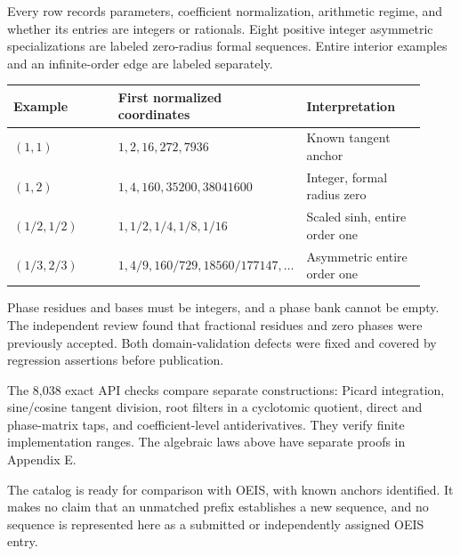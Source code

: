 Every row records parameters, coefficient normalization, arithmetic regime,
and whether its entries are integers or rationals. Eight positive integer
asymmetric specializations are labeled zero-radius formal sequences. Entire
interior examples and an infinite-order edge are labeled separately.

\begin{tabular}{@{}P{0.27\linewidth}P{0.35\linewidth}P{0.30\linewidth}@{}}
\toprule
Example & First normalized coordinates & Interpretation\\\midrule
$(1,1)$ & $1,2,16,272,7936$ & Known tangent anchor\\
$(1,2)$ & $1,4,160,35200,38041600$ & Integer, formal radius zero\\
$(1/2,1/2)$ & $1,1/2,1/4,1/8,1/16$ & Scaled sinh, entire order one\\
$(1/3,2/3)$ & $1,4/9,160/729,18560/177147,\ldots$ & Asymmetric entire order one\\
\bottomrule
\end{tabular}

Phase residues and bases must be integers, and a phase bank cannot be empty.
The independent review found that fractional residues and zero phases were
previously accepted. Both domain-validation defects were fixed and covered
by regression assertions before publication.

The 8,038 exact API checks compare separate constructions: Picard integration,
sine/cosine tangent division, root filters in a cyclotomic quotient,
direct and phase-matrix taps, and coefficient-level antiderivatives.
They verify finite implementation ranges. The algebraic laws above have
separate proofs in Appendix E.

The catalog is ready for comparison with OEIS, with known anchors identified.
It makes no claim that an unmatched prefix establishes a new sequence, and
no sequence is represented here as a submitted or independently assigned OEIS entry.
